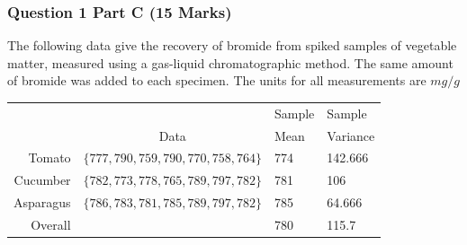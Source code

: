 \documentclass[a4paper,12pt]{article}
\begin{document}
\subsubsection*{Question 1 Part C (15 Marks)}
The following data give the recovery of bromide from spiked samples of vegetable matter, measured using a gas-liquid chromatographic method. The same amount of bromide was added to each specimen. 
The units for all measurements are  $mg /g$

\begin{center}
		\begin{tabular}{|r||c||l|l|} \hline
					& & Sample & Sample \\
			& Data & Mean & Variance\\ \hline \hline
		Tomato & $\{777, 790, 759, 790, 770, 758, 764\}$ & 774 & 142.666
		\\ \hline
		
		Cucumber& $\{782, 773, 778, 765, 789, 797, 782\}$ & 781 &  106\\ \hline
		
		Asparagus & $\{786, 783, 781, 785, 789, 797, 782 \}$& 785 & 64.666\\ \hline \hline
		Overall &&780&115.7\\ \hline
	\end{tabular} 
\end{center}
\end{document}
